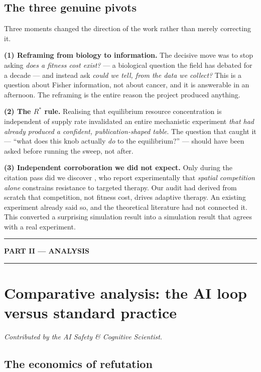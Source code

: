 \documentclass[11pt,a4paper]{article}
\begin{document}
\subsection{The three genuine pivots}

Three moments changed the direction of the work rather than merely correcting it.

\textbf{(1) Reframing from biology to information.} The decisive move was to stop asking
\emph{does a fitness cost exist?} --- a biological question the field has debated for a
decade --- and instead ask \emph{could we tell, from the data we collect?} This is a
question about Fisher information, not about cancer, and it is answerable in an
afternoon. The reframing is the entire reason the project produced anything.

\textbf{(2) The $R^*$ rule.} Realising that equilibrium resource concentration is
independent of supply rate \citep{tilman1982resource} invalidated an entire mechanistic
experiment \emph{that had already produced a confident, publication-shaped table}. The
question that caught it --- ``what does this knob actually \emph{do} to the
equilibrium?'' --- should have been asked before running the sweep, not after.

\textbf{(3) Independent corroboration we did not expect.} Only during the citation pass
did we discover \citet{bacevic2017spatial}, who report experimentally that
\emph{spatial competition alone} constrains resistance to targeted therapy. Our audit
had derived from scratch that competition, not fitness cost, drives adaptive therapy.
An existing experiment already said so, and the theoretical literature had not
connected it. This converted a surprising simulation result into a simulation result
that agrees with a real experiment.

\vspace{0.5em}
\hrule
\vspace{0.6em}
\begin{center}\large\bfseries PART II --- ANALYSIS\end{center}
\vspace{0.2em}
\hrule

\section{Comparative analysis: the AI loop versus standard practice}
\emph{Contributed by the AI Safety \& Cognitive Scientist.}

\subsection{The economics of refutation}
\end{document}
